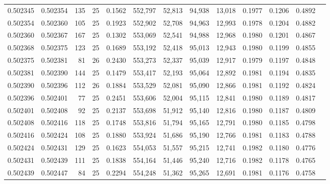 \begin{tabular}{rrrrrrrrrrrrr}
0.502345 & 0.502354 & 135 &  25 &                                     0.1562 & 552,797 &  52,813 &  94,938 &  13,018 & 0.1977 & 0.1206 & 0.4892 \\
0.502354 & 0.502360 & 105 &  25 &                                     0.1923 & 552,902 &  52,708 &  94,963 &  12,993 & 0.1978 & 0.1204 & 0.4882 \\
0.502360 & 0.502367 & 167 &  25 &                                     0.1302 & 553,069 &  52,541 &  94,988 &  12,968 & 0.1980 & 0.1201 & 0.4867 \\
0.502368 & 0.502375 & 123 &  25 &                                     0.1689 & 553,192 &  52,418 &  95,013 &  12,943 & 0.1980 & 0.1199 & 0.4855 \\
0.502375 & 0.502381 &  81 &  26 &                                     0.2430 & 553,273 &  52,337 &  95,039 &  12,917 & 0.1979 & 0.1197 & 0.4848 \\
0.502381 & 0.502390 & 144 &  25 &                                     0.1479 & 553,417 &  52,193 &  95,064 &  12,892 & 0.1981 & 0.1194 & 0.4835 \\
0.502390 & 0.502396 & 112 &  26 &                                     0.1884 & 553,529 &  52,081 &  95,090 &  12,866 & 0.1981 & 0.1192 & 0.4824 \\
0.502396 & 0.502401 &  77 &  25 &                                     0.2451 & 553,606 &  52,004 &  95,115 &  12,841 & 0.1980 & 0.1189 & 0.4817 \\
0.502401 & 0.502408 &  92 &  25 &                                     0.2137 & 553,698 &  51,912 &  95,140 &  12,816 & 0.1980 & 0.1187 & 0.4809 \\
0.502408 & 0.502416 & 118 &  25 &                                     0.1748 & 553,816 &  51,794 &  95,165 &  12,791 & 0.1980 & 0.1185 & 0.4798 \\
0.502416 & 0.502424 & 108 &  25 &                                     0.1880 & 553,924 &  51,686 &  95,190 &  12,766 & 0.1981 & 0.1183 & 0.4788 \\
0.502424 & 0.502431 & 129 &  25 &                                     0.1623 & 554,053 &  51,557 &  95,215 &  12,741 & 0.1982 & 0.1180 & 0.4776 \\
0.502431 & 0.502439 & 111 &  25 &                                     0.1838 & 554,164 &  51,446 &  95,240 &  12,716 & 0.1982 & 0.1178 & 0.4765 \\
0.502439 & 0.502447 &  84 &  25 &                                     0.2294 & 554,248 &  51,362 &  95,265 &  12,691 & 0.1981 & 0.1176 & 0.4758 \\

\end{tabular}
